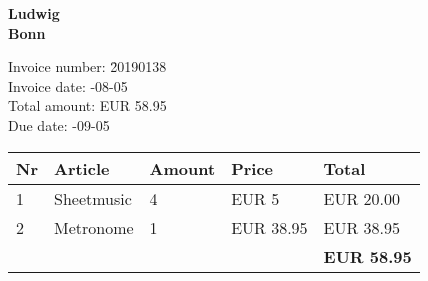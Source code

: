 \documentclass[a4paper]{article}
\begin{document}
\noindent\textbf{Ludwig\\Bonn}

\vspace{8mm}



\begin{tabbing}
Invoice number: \= 20190138 \\
Invoice date:   -08-05 \\
Total amount:   \> EUR 58.95 \\
Due date:       -09-05 \\
\end{tabbing}

\begin{tabular}{lp{30mm}ll|l}\\ \hline
{\bfseries Nr} &
{\bfseries Article} &
{\bfseries Amount} &
{\bfseries Price} &
{\bfseries Total} \\ \hline\hline
1 &Sheetmusic &4 &EUR 5 &EUR 20.00 \\2 &Metronome &1 &EUR 38.95 &EUR 38.95\\\hline
 & & & & \textbf{EUR 58.95} \\
\end{tabular}
\end{document}
